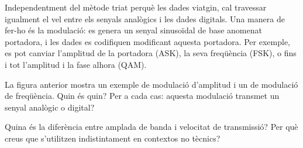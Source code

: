 Independentment del mètode triat perquè les dades viatgin, cal travessar igualment el vel entre els senyals analògics i les dades 
digitals. Una manera de fer-ho és la modulació: es genera un senyal sinusoïdal de base anomenat portadora,
i les dades es codifiquen modificant aquesta portadora. Per exemple, es pot canviar l'amplitud de la portadora (ASK),
la seva freqüència (FSK), o fins i tot l'amplitud i la fase alhora (QAM). 

\begin{exercise}
La figura anterior mostra un exemple de modulació d'amplitud i un de modulació de freqüència. 
Quin és quin? Per a cada cas: aquesta modulació transmet un senyal analògic o digital?
\end{exercise}


\begin{exercise}
Quina és la diferència entre amplada de banda i velocitat de transmissió? 
Per què creus que s'utilitzen indistintament en contextos no tècnics?
\end{exercise}
